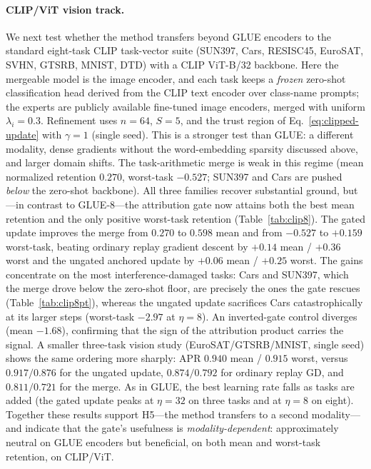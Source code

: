 \documentclass[11pt]{article}
\begin{document}
\paragraph{CLIP/ViT vision track.}
We next test whether the method transfers beyond GLUE encoders to the standard eight-task CLIP task-vector suite (SUN397, Cars, RESISC45, EuroSAT, SVHN, GTSRB, MNIST, DTD) with a CLIP ViT-B/32 backbone. Here the mergeable model is the image encoder, and each task keeps a \emph{frozen} zero-shot classification head derived from the CLIP text encoder over class-name prompts; the experts are publicly available fine-tuned image encoders, merged with uniform $\lambda_i=0.3$. Refinement uses $n=64$, $S=5$, and the trust region of Eq.~\eqref{eq:clipped-update} with $\gamma=1$ (single seed). This is a stronger test than GLUE: a different modality, dense gradients without the word-embedding sparsity discussed above, and larger domain shifts. The task-arithmetic merge is weak in this regime (mean normalized retention $0.270$, worst-task $-0.527$; SUN397 and Cars are pushed \emph{below} the zero-shot backbone). All three families recover substantial ground, but---in contrast to GLUE-8---the attribution gate now attains both the best mean retention and the only positive worst-task retention (Table~\ref{tab:clip8}). The gated update improves the merge from $0.270$ to $0.598$ mean and from $-0.527$ to $+0.159$ worst-task, beating ordinary replay gradient descent by $+0.14$ mean / $+0.36$ worst and the ungated anchored update by $+0.06$ mean / $+0.25$ worst. The gains concentrate on the most interference-damaged tasks: Cars and SUN397, which the merge drove below the zero-shot floor, are precisely the ones the gate rescues (Table~\ref{tab:clip8pt}), whereas the ungated update sacrifices Cars catastrophically at its larger steps (worst-task $-2.97$ at $\eta=8$). An inverted-gate control diverges (mean $-1.68$), confirming that the sign of the attribution product carries the signal. A smaller three-task vision study (EuroSAT/GTSRB/MNIST, single seed) shows the same ordering more sharply: APR $0.940$ mean / $0.915$ worst, versus $0.917/0.876$ for the ungated update, $0.874/0.792$ for ordinary replay GD, and $0.811/0.721$ for the merge. As in GLUE, the best learning rate falls as tasks are added (the gated update peaks at $\eta=32$ on three tasks and at $\eta=8$ on eight). Together these results support H5---the method transfers to a second modality---and indicate that the gate's usefulness is \emph{modality-dependent}: approximately neutral on GLUE encoders but beneficial, on both mean and worst-task retention, on CLIP/ViT.
\end{document}
